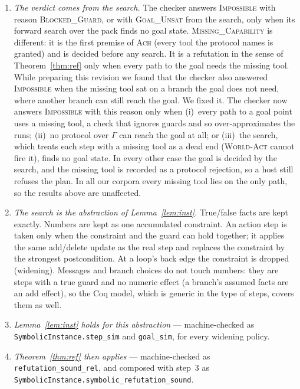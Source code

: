 \documentclass{article}
\theoremstyle{plain}
\theoremstyle{definition}
\newcommand{\id}[1]{\texttt{#1}}
\begin{document}
\begin{enumerate}\setlength{\itemsep}{2pt}
\item \emph{The verdict comes from the search.} The checker answers
\textsc{Impossible} with reason \textsc{Blocked\_Guard}, or with
\textsc{Goal\_Unsat} from the search, only when its forward search over the
pack finds no goal state. \textsc{Missing\_Capability} is different: it is the
first premise of \textsc{Ach} (every tool the protocol names is granted) and is
decided before any search. It is a refutation in the sense of
Theorem~\ref{thm:ref} only when every path to the goal needs the missing tool.
While preparing this revision we found that the checker also answered
\textsc{Impossible} when the missing tool sat on a branch the goal does not
need, where another branch can still reach the goal. We fixed it. The checker
now answers \textsc{Impossible} with this reason only when (i)~every path to a
goal point uses a missing tool, a check that ignores guards and so
over-approximates the runs; (ii)~no protocol over $\Gamma$ can reach the goal
at all; or (iii)~the search, which treats each step with a missing tool as a
dead end (\textsc{World-Act} cannot fire it), finds no goal state. In every
other case the goal is decided by the search, and the missing tool is recorded
as a protocol rejection, so a host still refuses the plan. In all our corpora
every missing tool lies on the only path, so the results above are
unaffected.
\item \emph{The search is the abstraction of Lemma~\ref{lem:inst}.} True/false
facts are kept exactly. Numbers are kept as one accumulated constraint. An
action step is taken only when the constraint and the guard can hold together;
it applies the same add/delete update as the real step and replaces the
constraint by the strongest postcondition. At a loop's back edge the constraint
is dropped (widening). Messages and branch choices do not touch numbers: they
are steps with a true guard and no numeric effect (a branch's assumed facts are
an add effect), so the Coq model, which is generic in the type of steps,
covers them as well.
\item \emph{Lemma~\ref{lem:inst} holds for this abstraction} --- machine-checked
as \id{SymbolicInstance.step\_sim} and \id{goal\_sim}, for every widening
policy.
\item \emph{Theorem~\ref{thm:ref} then applies} --- machine-checked as
\id{refutation\_sound\_rel}, and composed with step~3 as
\id{SymbolicInstance.symbolic\_refutation\_sound}.
\end{enumerate}
\end{document}
